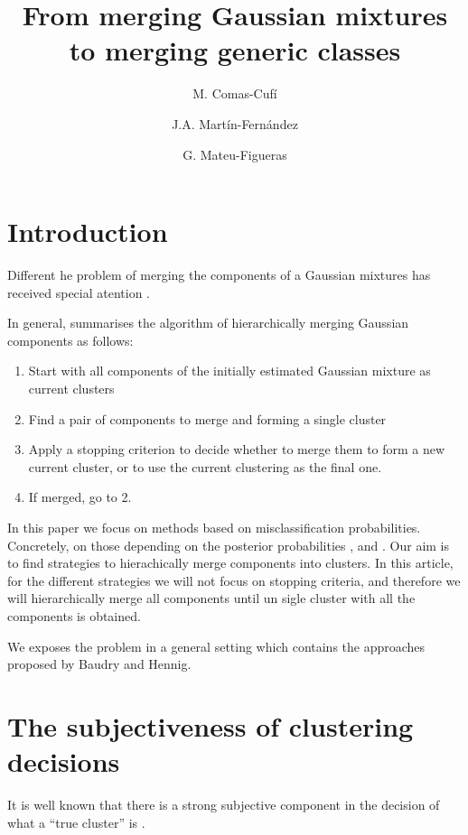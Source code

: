 \documentclass[10pt, a4paper]{article}
\title{From merging Gaussian mixtures to merging generic classes}
\author{M. Comas-Cufí \and J.A. Martín-Fernández \and G. Mateu-Figueras}
\begin{document}
\maketitle

\section{Introduction}

Different he problem of merging the components of a Gaussian mixtures has received special atention \cite{melnykov2013distribution,lee2004combining,hennig2010methods,baudry2010combining,pastore2013merging}. 

In general, \cite{hennig2010methods} summarises the algorithm of hierarchically merging Gaussian components as follows:
\begin{enumerate}
\item Start with all components of the initially estimated Gaussian mixture as current clusters
\item Find a pair of components to merge and forming a single cluster
\item Apply a stopping criterion to decide whether to merge them to form a new current cluster, or to use the current clustering as the final one.
\item If merged, go to 2.
\end{enumerate}

In this paper we focus on methods based on misclassification probabilities. Concretely, on those depending on the posterior probabilities \citep{melnykov2013distribution}, \citep{baudry2010combining} and \citep[in \textsc{demp} approach]{hennig2010methods}. Our aim is to find strategies to hierachically merge components into clusters. In this article, for the different strategies we will not focus on stopping criteria, and therefore we will hierarchically merge all components until un sigle cluster with all the components is obtained.


We exposes the problem in a general setting which contains the approaches proposed by Baudry and Hennig.

\section{The subjectiveness of clustering decisions}

It is well known that there is a strong subjective component in the decision of what a ``true cluster'' is \citep{hennig2010methods}.
\end{document}
